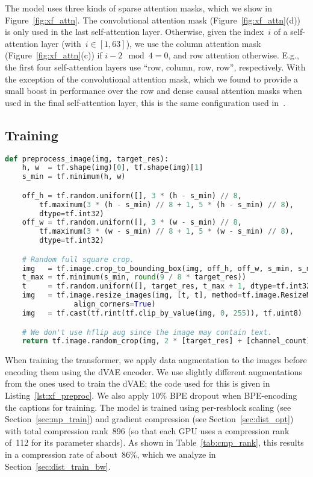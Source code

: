 \documentclass{article}
\begin{document}
The model uses three kinds of sparse attention masks, which we show in Figure~\ref{fig:xf_attn}. The convolutional attention mask (Figure~\ref{fig:xf_attn}(d)) is only used in the last self-attention layer. Otherwise, given the index~$i$ of a self-attention layer (with~$i \in [1, 63]$), we use the column attention mask (Figure~\ref{fig:xf_attn}(c)) if $i - 2 \!\!\mod 4 = 0$, and row attention otherwise. E.g., the first four self-attention layers use ``row, column, row, row'', respectively. With the exception of the convolutional attention mask, which we found to provide a small boost in performance over the row and dense causal attention masks when used in the final self-attention layer, this is the same configuration used in~\citet{child2019generating}.

\subsection{Training}
\label{sec:xf_train}
\begin{lstlisting}[language=Python,basicstyle=\footnotesize\ttfamily,caption={TensorFlow~\cite{abadi2016tensorflow} image preprocessing code for training the transformer. We use \texttt{target\_res = 256} and \texttt{channel\_count = 3}.},label={lst:xf_preproc},captionpos=b,float=tp,floatplacement=tbp]
def preprocess_image(img, target_res):
    h, w  = tf.shape(img)[0], tf.shape(img)[1]
    s_min = tf.minimum(h, w)

    off_h = tf.random.uniform([], 3 * (h - s_min) // 8,
        tf.maximum(3 * (h - s_min) // 8 + 1, 5 * (h - s_min) // 8),
        dtype=tf.int32)
    off_w = tf.random.uniform([], 3 * (w - s_min) // 8,
        tf.maximum(3 * (w - s_min) // 8 + 1, 5 * (w - s_min) // 8),
        dtype=tf.int32)

    # Random full square crop.
    img   = tf.image.crop_to_bounding_box(img, off_h, off_w, s_min, s_min)
    t_max = tf.minimum(s_min, round(9 / 8 * target_res))
    t     = tf.random.uniform([], target_res, t_max + 1, dtype=tf.int32)
    img   = tf.image.resize_images(img, [t, t], method=tf.image.ResizeMethod.AREA,
                align_corners=True)
    img   = tf.cast(tf.rint(tf.clip_by_value(img, 0, 255)), tf.uint8)

    # We don't use hflip aug since the image may contain text.
    return tf.image.random_crop(img, 2 * [target_res] + [channel_count])
\end{lstlisting}

When training the transformer, we apply data augmentation to the images before encoding them using the dVAE encoder. We use slightly different augmentations from the ones used to train the dVAE; the code used for this is given in Listing~\ref{lst:xf_preproc}. We also apply 10\% BPE dropout when BPE-encoding the captions for training. The model is trained using per-resblock scaling (see Section~\ref{sec:mp_train}) and gradient compression (see Section~\ref{sec:dist_opt}) with total compression rank~896 (so that each GPU uses a compression rank of~112 for its parameter shards). As shown in Table~\ref{tab:cmp_rank}, this results in a compression rate of about~86\%, which we analyze in Section~\ref{sec:dist_train_bw}.
\end{document}
